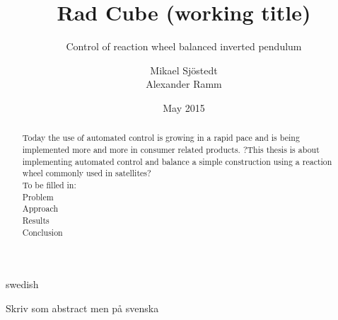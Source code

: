 \documentclass[a4paper,11pt]{kth-mag}
\title{Rad Cube (working title)}
\subtitle{Control of reaction wheel balanced inverted pendulum}
\author{Mikael Sjöstedt \\ Alexander Ramm}
\date{May 2015}
\begin{document}
%
\clearpage

\frontmatter
\pagestyle{plain}
{}
\maketitle
{}
\begin{abstract}
Today the use of automated control is growing in a rapid pace and is being implemented more and more in consumer related products. ?This thesis is about implementing automated control and balance a simple construction using a reaction wheel commonly used in satellites? 
\\ To be filled in:
\\	Problem
\\	Approach %
\\	Results
\\ 	Conclusion


\end{abstract}
\cleardoublepage
\begin{foreignabstract}{swedish}
Skriv som abstract men på svenska
\\


\end{foreignabstract}
\clearpage
\end{document}
